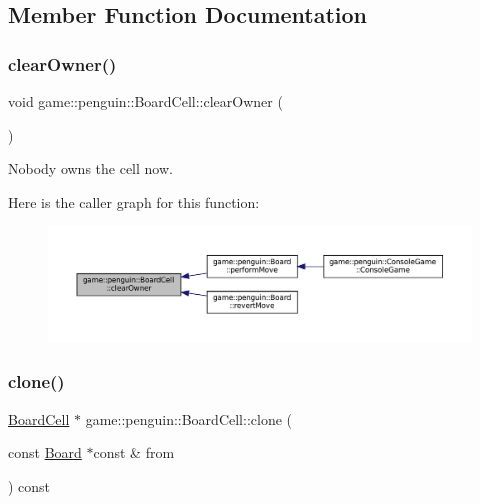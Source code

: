 \subsection{Member Function Documentation}
\mbox{\label{classgame_1_1penguin_1_1_board_cell_a923c503caf2ed45b2fb0f49eb0cf3201}} 
\subsubsection{\texorpdfstring{clear\+Owner()}{clearOwner()}}
{\footnotesize\ttfamily void game\+::penguin\+::\+Board\+Cell\+::clear\+Owner (\begin{DoxyParamCaption}{ }\end{DoxyParamCaption})\hspace{0.3cm}{\ttfamily [inline]}}



Nobody owns the cell now. 

Here is the caller graph for this function\+:
\nopagebreak
\begin{figure}[H]
\begin{center}
\leavevmode
\includegraphics[width=350pt]{classgame_1_1penguin_1_1_board_cell_a923c503caf2ed45b2fb0f49eb0cf3201_icgraph}
\end{center}
\end{figure}
\mbox{\label{classgame_1_1penguin_1_1_board_cell_a4d3577488552bf0ba4822ac265532825}} 
\subsubsection{\texorpdfstring{clone()}{clone()}}
{\footnotesize\ttfamily \hyperlink{classgame_1_1penguin_1_1_board_cell}{Board\+Cell} $\ast$ game\+::penguin\+::\+Board\+Cell\+::clone (\begin{DoxyParamCaption}\item[{const \hyperlink{classgame_1_1penguin_1_1_board}{Board} $\ast$const \&}]{from }\end{DoxyParamCaption}) const}

